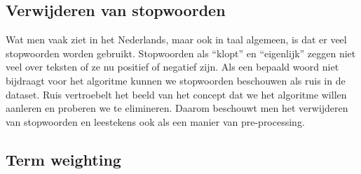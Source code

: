 \subsection{Verwijderen van stopwoorden}\label{Verwijderen van stopwoorden en leestekens}

Wat men vaak ziet in het Nederlands, maar ook in taal algemeen, is dat er veel stopwoorden worden gebruikt. Stopwoorden als ``klopt'' en ``eigenlijk'' zeggen niet veel over teksten of ze nu positief of negatief zijn. Als een bepaald woord niet bijdraagt voor het algoritme kunnen we stopwoorden beschouwen als ruis in de dataset. Ruis vertroebelt het beeld van het concept dat we het algoritme willen aanleren en proberen we te elimineren. Daarom beschouwt men het verwijderen van stopwoorden en leestekens ook als een manier van pre-processing.

\subsection{Term weighting}\label{Term weighting}

